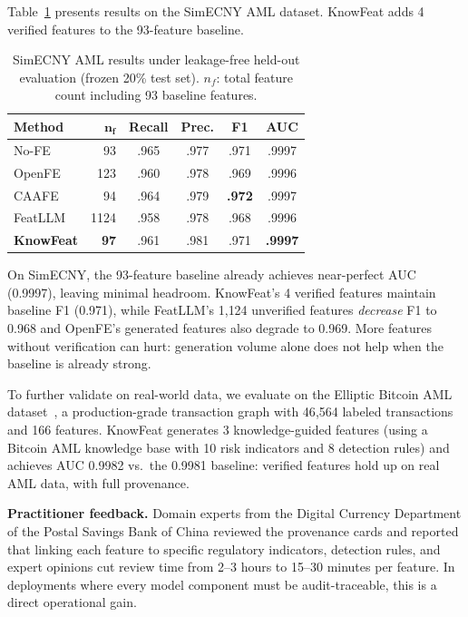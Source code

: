 Table~\ref{tab:simecny} presents results on the SimECNY AML dataset. KnowFeat adds 4 verified features to the 93-feature baseline.

\begin{table}[t]
\centering
\caption{SimECNY AML results under leakage-free held-out evaluation (frozen 20\% test set). $n_f$: total feature count including 93 baseline features.}
\label{tab:simecny}
\small
\renewcommand{\arraystretch}{1.2}
\setlength{\tabcolsep}{3pt}
\begin{tabular}{l r c c c c}
\hline
\textbf{Method} & $\boldsymbol{n_f}$ & \textbf{Recall} & \textbf{Prec.} & \textbf{F1} & \textbf{AUC} \\
\hline
No-FE     & 93   & .965 & .977 & .971 & .9997 \\
OpenFE    & 123  & .960 & .978 & .969 & .9996 \\
CAAFE     & 94   & .964 & .979 & \textbf{.972} & .9997 \\
FeatLLM   & 1124 & .958 & .978 & .968 & .9996 \\
\textbf{KnowFeat} & \textbf{97} & .961 & .981 & .971 & \textbf{.9997} \\
\hline
\end{tabular}
\end{table}

On SimECNY, the 93-feature baseline already achieves near-perfect AUC (0.9997), leaving minimal headroom. KnowFeat's 4 verified features maintain baseline F1 (0.971), while FeatLLM's 1{,}124 unverified features \emph{decrease} F1 to 0.968 and OpenFE's generated features also degrade to 0.969. More features without verification can hurt: generation volume alone does not help when the baseline is already strong.

To further validate on real-world data, we evaluate on the Elliptic Bitcoin AML dataset~\cite{weber2019anti}, a production-grade transaction graph with 46{,}564 labeled transactions and 166 features. KnowFeat generates 3 knowledge-guided features (using a Bitcoin AML knowledge base with 10 risk indicators and 8 detection rules) and achieves AUC 0.9982 vs.\ the 0.9981 baseline: verified features hold up on real AML data, with full provenance.

\textbf{Practitioner feedback.}
Domain experts from the Digital Currency Department of the Postal Savings Bank of China reviewed the provenance cards and reported that linking each feature to specific regulatory indicators, detection rules, and expert opinions cut review time from 2--3 hours to 15--30 minutes per feature. In deployments where every model component must be audit-traceable, this is a direct operational gain.

